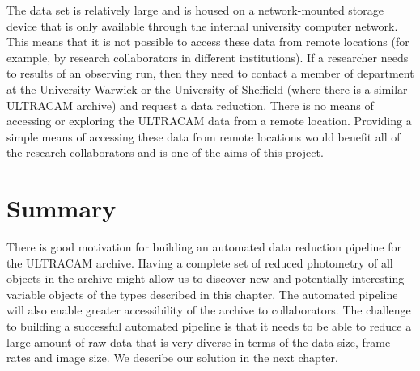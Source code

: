The data set is relatively large and is housed on a network-mounted storage device that is only available through the internal university computer network. This means that it is not possible to access these data from remote locations (for example, by research collaborators in different institutions). If a researcher needs to results of an observing run, then they need to contact a member of department at the University Warwick or the University of Sheffield (where there is a similar ULTRACAM archive) and request a data reduction. There is no means of accessing or exploring the ULTRACAM data from a remote location. Providing a simple means of accessing these data from remote locations would benefit all of the research collaborators and is one of the aims of this project.

\section{Summary}
There is good motivation for building an automated data reduction pipeline for the ULTRACAM archive. Having a complete set of reduced photometry of all objects in the archive might allow us to discover new and potentially interesting variable objects of the types described in this chapter. The automated pipeline will also enable greater accessibility of the archive to collaborators. The challenge to building a successful automated pipeline is that it needs to be able to reduce a large amount of raw data that is very diverse in terms of the data size, frame-rates and image size. We describe our solution in the next chapter. 